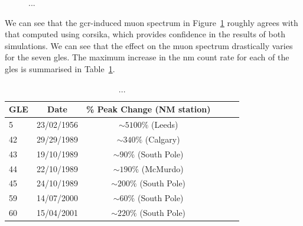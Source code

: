 \begin{figure}[ht!]
	\centering
	\qquad
	\caption{...}
	\label{fig:MAIRE_muon_spectra}
\end{figure}



We can see that the \gls{gcr}-induced muon spectrum in Figure~\ref{fig:MAIRE_muon_spectra} roughly agrees with that computed using \gls{corsika}, which provides confidence in the results of both simulations. We can see that the effect on the muon spectrum drastically varies for the seven \glspl{gle}. The maximum increase in the \gls{nm} count rate for each of the \glspl{gle} is summarised in Table~\ref{tab:MAIRE_GLEs}. 

\begin{table}
	\begin{center}
		\caption{...}
		\label{tab:MAIRE_GLEs}
		\begin{tabular}{l c c c c c}
			\hline
			GLE & Date & \% Peak Change (NM station) \\
			\hline
			5 & 23/02/1956 & $\sim 5100\%$ (Leeds) \\
			42 & 29/29/1989 & $\sim 340\%$ (Calgary) \\
			43 & 19/10/1989 & $\sim 90\%$ (South Pole) \\
			44  & 22/10/1989 & $\sim 190\%$ (McMurdo) \\
			45  & 24/10/1989 & $\sim 200\%$ (South Pole) \\
			59 & 14/07/2000 & $\sim 60\%$ (South Pole) \\
			60 & 15/04/2001 & $\sim 220\%$ (South Pole) \\
			\hline
		\end{tabular}
	\end{center}
\end{table}

